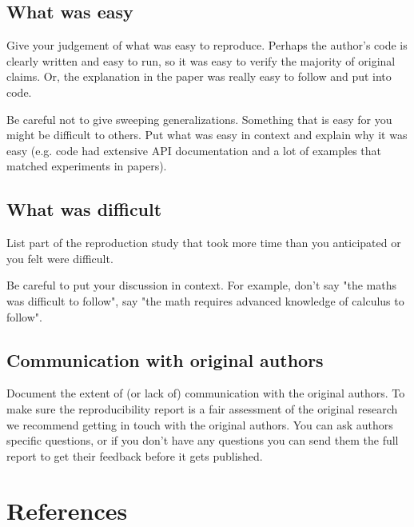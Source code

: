 \documentclass{article}
\begin{document}
\subsection{What was easy}
Give your judgement of what was easy to reproduce. Perhaps the author's code is clearly written and easy to run, so it was easy to verify the majority of original claims. Or, the explanation in the paper was really easy to follow and put into code. 

Be careful not to give sweeping generalizations. Something that is easy for you might be difficult to others. Put what was easy in context and explain why it was easy (e.g. code had extensive API documentation and a lot of examples that matched experiments in papers). 

\subsection{What was difficult}
List part of the reproduction study that took more time than you anticipated or you felt were difficult. 

Be careful to put your discussion in context. For example, don't say "the maths was difficult to follow", say "the math requires advanced knowledge of calculus to follow". 

\subsection{Communication with original authors}
Document the extent of (or lack of) communication with the original authors. To make sure the reproducibility report is a fair assessment of the original research we recommend getting in touch with the original authors. You can ask authors specific questions, or if you don't have any questions you can send them the full report to get their feedback before it gets published. 



\section*{References}
\end{document}

